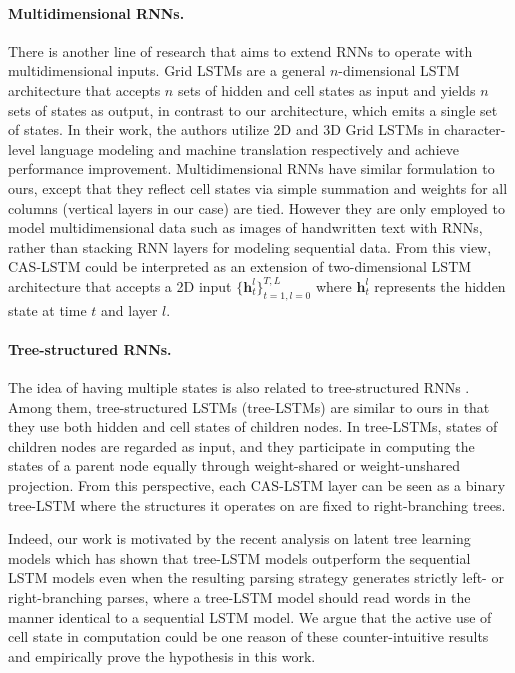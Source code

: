 \documentclass[wcp]{jmlr}
\begin{document}
    \paragraph{Multidimensional RNNs.}
    There is another line of research that aims to extend RNNs to operate with multidimensional inputs.
    Grid LSTMs \citep{kalchbrenner2016grid} are a general $n$-dimensional LSTM architecture that accepts $n$ sets of hidden and cell states as input and yields $n$ sets of states as output, in contrast to our architecture, which emits a single set of states.
    In their work, the authors utilize 2D and 3D Grid LSTMs in character-level language modeling and machine translation respectively and achieve performance improvement.
    Multidimensional RNNs \citep{graves2007mdrnn,graves2009offline} have similar formulation to ours, except that they reflect cell states via simple summation and weights for all columns (vertical layers in our case) are tied.
    However they are only employed to model multidimensional data such as images of handwritten text with RNNs, rather than stacking RNN layers for modeling sequential data.
    From this view, CAS-LSTM could be interpreted as an extension of two-dimensional LSTM architecture that accepts a 2D input $\{\mathbf{h}_t^l\}_{t=1,l=0}^{T,L}$ where $\mathbf{h}_t^l$ represents the hidden state at time $t$ and layer $l$.
    
    \paragraph{Tree-structured RNNs.}
    The idea of having multiple states is also related to tree-structured RNNs \citep{goller1996learning,socher2011parsing}.
    Among them, tree-structured LSTMs (tree-LSTMs) \citep{tai2015treelstm,zhu2015treelstm,le2015treelstm} are similar to ours in that they use both hidden and cell states of children nodes.
    In tree-LSTMs, states of children nodes are regarded as input, and they participate in computing the states of a parent node equally through weight-shared or weight-unshared projection.
    From this perspective, each CAS-LSTM layer can be seen as a binary tree-LSTM where the structures it operates on are fixed to right-branching trees.
    
    Indeed, our work is motivated by the recent analysis \citep{williams2018do,shi2018ontree} on latent tree learning models \citep{yogatama2017learning,choi2018learning} which has shown that tree-LSTM models outperform the sequential LSTM models even when the resulting parsing strategy generates strictly left- or right-branching parses, where a tree-LSTM model should read words in the manner identical to a sequential LSTM model.
    We argue that the active use of cell state in computation could be one reason of these counter-intuitive results and empirically prove the hypothesis in this work.
    
\end{document}
